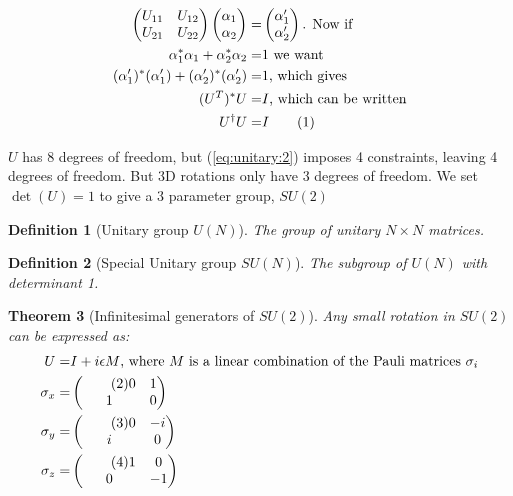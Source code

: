 \documentclass[]{article}
\newcommand\numberthis{\addtocounter{equation}{1}\tag{\theequation}}
\newtheorem{thm}{Theorem}
\newtheorem{defn}[thm]{Definition}
\begin{document}
\begin{align*}
	\begin{pmatrix}
		U_{11}&U_{12}\\
		U_{21}&U_{22}
	\end{pmatrix} 	\begin{pmatrix}
		\alpha_1\\
		\alpha_2
	\end{pmatrix} =& \begin{pmatrix}
		\alpha^\prime_1\\
		\alpha^\prime_2
	\end{pmatrix} \text{{. Now if}}\\
	\alpha^*_1 \alpha_1 + \alpha^*_2 \alpha_2 =& 1 \text{ we want}\\
	(\alpha^\prime_1)^* (\alpha^\prime_1) + (\alpha^\prime_2)^* (\alpha^\prime_2) =& 1 \text{, which gives}\\
	(U^T)^* U =& I \text{, which can be written} \\
	U^\dagger U =& I \numberthis \label{eq:unitary:2}
\end{align*}

$U$ has 8 degrees of freedom, but (\ref{eq:unitary:2}) imposes 4 constraints, leaving 4 degrees of freedom. But 3D rotations only have 3 degrees of freedom. We set $\det(U)=1$ to give a 3 parameter group, $SU(2)$

\begin{defn}[Unitary group $U(N)$]
	The group of unitary $N\times N$ matrices.
\end{defn}

\begin{defn}[Special Unitary group $SU(N)$]
	The subgroup of $U(N)$ with determinant 1.
\end{defn}

\begin{thm}[Infinitesimal generators of $SU(2)$]
	Any small rotation in $SU(2)$ can be expressed as:
	\begin{align*}
		U =& I + i \epsilon M \text{, where $M$ is a linear combination of the Pauli matrices $\sigma_i$}\\
		\sigma_x =& \begin{pmatrix} \numberthis \label{eq:pauli:x}
		0&1\\
		1&0
		\end{pmatrix}\\
		\sigma_y =& \begin{pmatrix} \numberthis \label{eq:pauli:y}
		0&-i\\
		i&0
		\end{pmatrix}\\
		\sigma_z =& \begin{pmatrix} \numberthis \label{eq:pauli:z}
		1&0\\
		0&-1
		\end{pmatrix}
	\end{align*}
\end{thm}
\end{document}
